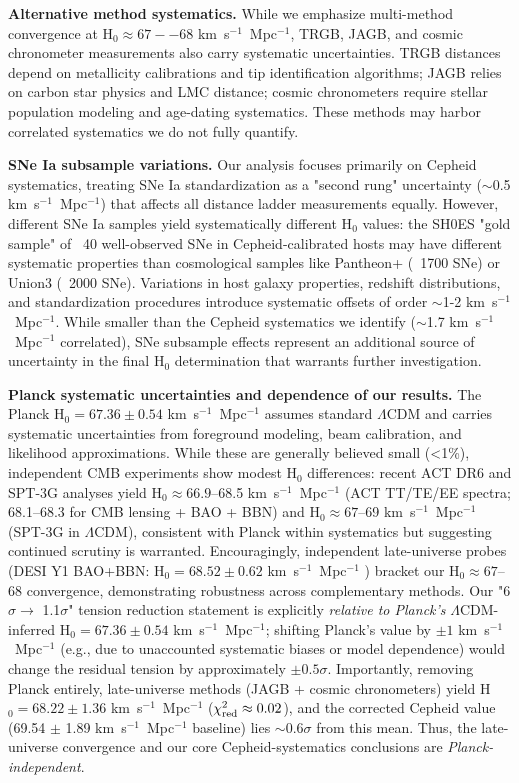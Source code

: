 \documentclass[preprint, linenumbers]{aastex701}
\begin{document}
\textbf{Alternative method systematics.} While we emphasize multi-method convergence at H$_0 \approx 67--68$ km~s$^{-1}$~Mpc$^{-1}$, TRGB, JAGB, and cosmic chronometer measurements also carry systematic uncertainties. TRGB distances depend on metallicity calibrations and tip identification algorithms; JAGB relies on carbon star physics and LMC distance; cosmic chronometers require stellar population modeling and age-dating systematics. These methods may harbor correlated systematics we do not fully quantify.

\textbf{SNe Ia subsample variations.} Our analysis focuses primarily on Cepheid systematics, treating SNe Ia standardization as a "second rung" uncertainty ($\sim$0.5 km~s$^{-1}$~Mpc$^{-1}$) that affects all distance ladder measurements equally. However, different SNe Ia samples yield systematically different H$_0$ values: the SH0ES "gold sample" of ~40 well-observed SNe in Cepheid-calibrated hosts may have different systematic properties than cosmological samples like Pantheon+ (~1700 SNe) or Union3 (~2000 SNe). Variations in host galaxy properties, redshift distributions, and standardization procedures introduce systematic offsets of order $\sim$1-2 km~s$^{-1}$~Mpc$^{-1}$. While smaller than the Cepheid systematics we identify ($\sim$1.7 km~s$^{-1}$~Mpc$^{-1}$ correlated), SNe subsample effects represent an additional source of uncertainty in the final H$_0$ determination that warrants further investigation.

\textbf{Planck systematic uncertainties and dependence of our results.} The Planck H$_0 = 67.36 \pm 0.54$ km~s$^{-1}$~Mpc$^{-1}$ assumes standard $\Lambda$CDM and carries systematic uncertainties from foreground modeling, beam calibration, and likelihood approximations. While these are generally believed small (<1\%), independent CMB experiments show modest H$_0$ differences: recent ACT DR6 \citep{ACT_DR6_Lensing} and SPT-3G \citep{SPT2025} analyses yield H$_0 \approx 66.9$--68.5 km~s$^{-1}$~Mpc$^{-1}$ (ACT TT/TE/EE spectra; 68.1--68.3 for CMB lensing + BAO + BBN) and H$_0 \approx 67$--69 km~s$^{-1}$~Mpc$^{-1}$ (SPT-3G in $\Lambda$CDM), consistent with Planck within systematics but suggesting continued scrutiny is warranted. Encouragingly, independent late-universe probes (DESI Y1 BAO+BBN: H$_0 = 68.52 \pm 0.62$ km~s$^{-1}$~Mpc$^{-1}$ \citep{DESI2025}) bracket our H$_0 \approx 67$--68 convergence, demonstrating robustness across complementary methods. Our "6$\sigma \to$ 1.1$\sigma$" tension reduction statement is explicitly \textit{relative to Planck's} $\Lambda$CDM-inferred H$_0 = 67.36 \pm 0.54$ km~s$^{-1}$~Mpc$^{-1}$; shifting Planck's value by $\pm 1$ km~s$^{-1}$~Mpc$^{-1}$ (e.g., due to unaccounted systematic biases or model dependence) would change the residual tension by approximately $\pm 0.5\sigma$. Importantly, removing Planck entirely, late-universe methods (JAGB + cosmic chronometers) yield H$_0 = 68.22 \pm 1.36$ km~s$^{-1}$~Mpc$^{-1}$ ($\chi^2_{\rm red} \approx 0.02$), and the corrected Cepheid value (69.54 $\pm$ 1.89 km~s$^{-1}$~Mpc$^{-1}$ baseline) lies $\sim$0.6$\sigma$ from this mean. Thus, the late-universe convergence and our core Cepheid-systematics conclusions are \textit{Planck-independent}.
\end{document}
